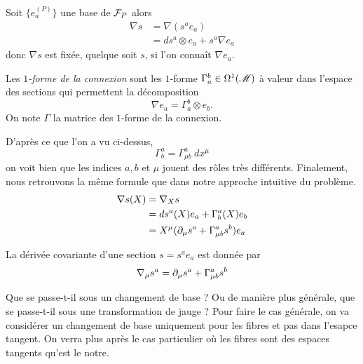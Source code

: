 \documentclass[a4paper,11pt]{report}
\begin{document}
                Soit $\{e_a^{(P)}\}$ une base de $\mathcal{F}_P$ alors
                \begin{align}
                    \nabla s &= \nabla(s^a e_a)\\
                    &= ds^a\otimes e_a+s^a\nabla e_a
                \end{align}
            donc $\nabla s$ est fixée, quelque soit $s$, si l'on connaît $\nabla e_a$. 
            \begin{defn}
                Les \textit{$1$-forme de la connexion} sont les  $1$-forme $\Gamma^b_a\in\Omega^1(\mathscr{M})$ à valeur dans l'espace des sections qui permettent la décomposition
                \begin{equation}
                    \nabla e_a = \Gamma^b_a \otimes e_b.
                \end{equation}
                On note $\Gamma$ la matrice des $1$-forme de la connexion.
             \end{defn}
             
            D'après ce que l'on a vu ci-dessus,
            \begin{equation}
                 \Gamma^a_b = \Gamma^a_{\mu b}~dx^\mu
            \end{equation}
            on voit bien que les indices $a,b$ et $\mu$ jouent des rôles très différents. Finalement, nous retrouvons la même formule que dans notre approche intuitive du problème.
            \begin{align}
                 \nabla s(X) &= \nabla_X s\\
                 &= ds^a(X)e_a+\Gamma^a_b(X)e_b\\
                 &= X^\mu(\partial_\mu s^a+\Gamma^a_{\mu b}s^b)e_a
            \end{align}
             
            \begin{prop}\begin{leftbar}
                    La dérivée covariante d'une section $s = s^a e_a$ est donnée par
                    \begin{equation}
                        \nabla_\mu s^a = \partial_\mu s^a+\Gamma^a_{\mu b}s^b
                    \end{equation}
            \end{leftbar}\end{prop}
             
            Que se passe-t-il sous un changement de base ? Ou de manière plus générale, que se passe-t-il sous une transformation de jauge ? Pour faire le cas générale, on va considérer un changement de base uniquement pour les fibres et pas dans l'esapce tangent. On verra plus après le cas particulier où les fibres sont des espaces tangents qu'est le notre.
            
\end{document}
